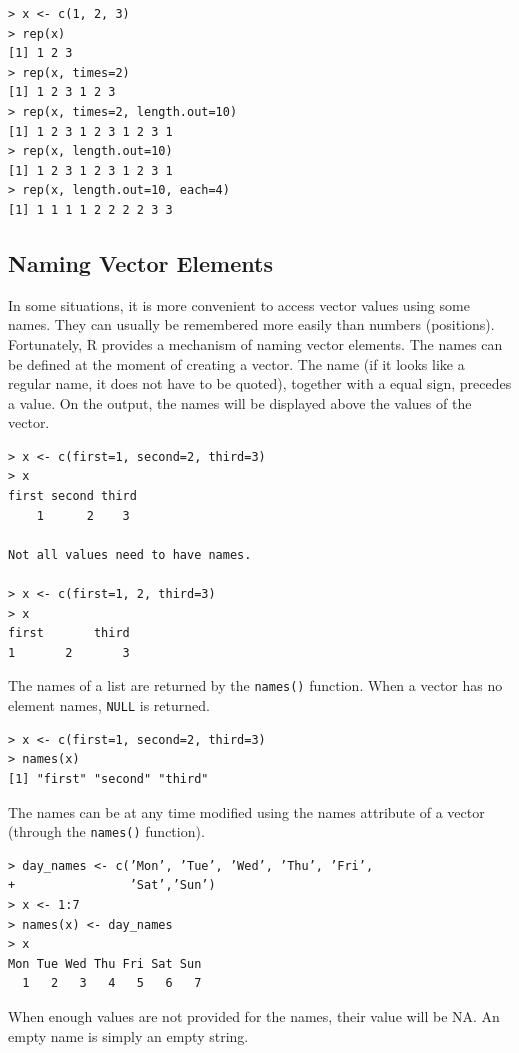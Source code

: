 \begin{verbatim}
> x <- c(1, 2, 3)
> rep(x)
[1] 1 2 3
> rep(x, times=2)
[1] 1 2 3 1 2 3
> rep(x, times=2, length.out=10)
[1] 1 2 3 1 2 3 1 2 3 1
> rep(x, length.out=10)
[1] 1 2 3 1 2 3 1 2 3 1
> rep(x, length.out=10, each=4)
[1] 1 1 1 1 2 2 2 2 3 3
\end{verbatim}

\subsection{Naming Vector Elements}

In some situations, it is more convenient to access vector values using some
names. They can usually be remembered more easily than numbers (positions). Fortunately, R provides a mechanism of naming vector elements. The names can
be defined at the moment of creating a vector. The name (if it looks like a regular
name, it does not have to be quoted), together with a equal sign, precedes a value.
On the output, the names will be displayed above the values of the vector.

\begin{verbatim}
> x <- c(first=1, second=2, third=3)
> x
first second third
    1      2    3
    
Not all values need to have names.

> x <- c(first=1, 2, third=3)
> x
first       third
1       2       3
\end{verbatim}

The names of a list are returned by the \texttt{names()} function. When a vector has
no element names, \texttt{NULL} is returned.

\begin{verbatim}
> x <- c(first=1, second=2, third=3)
> names(x)
[1] "first" "second" "third"
\end{verbatim}

The names can be at any time modified using the names attribute of a vector
(through the \texttt{names()} function).

\begin{verbatim}
> day_names <- c(’Mon’, ’Tue’, ’Wed’, ’Thu’, ’Fri’,
+                ’Sat’,’Sun’)
> x <- 1:7
> names(x) <- day_names
> x
Mon Tue Wed Thu Fri Sat Sun
  1   2   3   4   5   6   7
\end{verbatim}

When enough values are not provided for the names, their value will be NA.
An empty name is simply an empty string.

